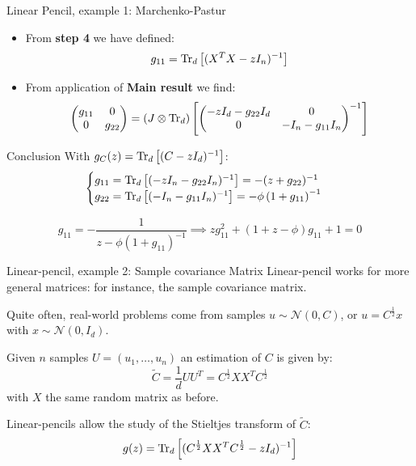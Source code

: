 \documentclass[10pt]{beamer}
\begin{document}
\begin{frame}{Linear Pencil, example 1: Marchenko-Pastur}
  \begin{itemize}
    \item From \textbf{step 4} we have defined:
    \begin{equation}
      g_{11} = \traceLim[d]{ (X^TX - zI_n)^{-1}}
    \end{equation}
    \item From application of \textbf{Main result} we find:
    \begin{equation*}
      \begin{pmatrix}
        g_{11} & 0\\
        0 & g_{22}
      \end{pmatrix}
      = \traceLimOp[d]{
        \begin{pmatrix}
          -zI_d - g_{22} I_d & 0\\
          0 & -I_n - g_{11} I_n
        \end{pmatrix}^{-1}
      }
      \end{equation*}
  \end{itemize}

  \begin{alertblock}{Conclusion}
    With $g_C(z) = \traceLim[d]{ (C - zI_d)^{-1}}$:
    \begin{equation*}
      \begin{cases}
        g_{11} = \traceLim[d]{ (-zI_n - g_{22}I_n)^{-1} } = - (z + g_{22})^{-1}\\
        g_{22} = \traceLim[d]{ (-I_n - g_{11}I_n)^{-1} }
        = - \phi \left( 
          1 + g_{11} 
          \right)^{-1}
      \end{cases}
    \end{equation*}
  \end{alertblock}

  $$
    g_{11} = -\frac{1}{z - \phi (1+g_{11})^{-1}}
    \implies
    z g_{11}^2 + (1+z-\phi) g_{11} +1 = 0
  $$

\end{frame}



\begin{frame}{Linear-pencil, example 2: Sample covariance Matrix}
  Linear-pencil works for more general matrices: for instance, the sample covariance matrix.

  Quite often, real-world problems come from samples $u \sim \mathcal N(0, C)$,
  or $u = C^{\frac12}x$ with $x \sim \mathcal N(0, I_d)$.

  Given $n$ samples $U=(u_1, \ldots, u_n)$ an estimation of $C$ is given by:
  $$ \tilde C = \frac{1}{d} UU^T = C^{\frac12} X X^T C^{\frac12}$$ with $X$ the same random matrix as before.

  Linear-pencils allow the study of the Stieltjes transform of $\tilde C$:
  $$
  g(z) =  \traceLim[d]{(C^{\frac12} X X^T C^{\frac12} - zI_d)^{-1} }
  $$
\end{frame}
\end{document}

